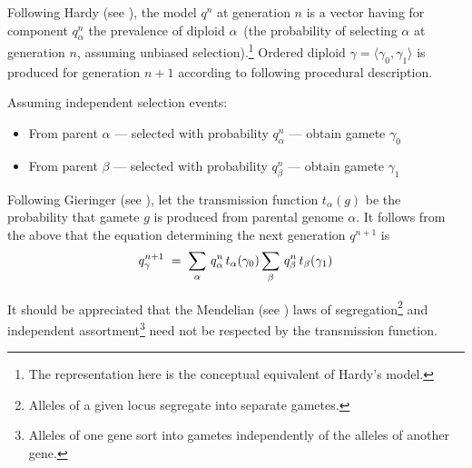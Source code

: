 Following Hardy (see \cite{Hardy1908}), the model $q^{n}$ at generation $n$
is a vector having for component $q_\alpha^n$ the prevalence of
diploid $\alpha\,$ (the probability of selecting $\alpha$ \nudge at
generation $n$, assuming unbiased selection).\footnote{The
  representation here is the conceptual equivalent of Hardy's model.}
Ordered diploid $\gamma = \langle \gamma_0, \gamma_1 \rangle$ is
produced for generation $n+1$ according to following procedural
description.

  Assuming independent selection events:
\begin{itemize}
\item From parent $\alpha$ --- selected with probability
  $q_\alpha^n$ --- obtain gamete $\gamma_0$
\item From parent $\beta$ --- selected with probability $q_\beta^n$
  --- obtain gamete $\gamma_1$
\end{itemize}
Following Gieringer (see \cite{Geiringer1944}), let the transmission
function $t_\alpha(g)$ be the probability that gamete $g$ is produced
from parental genome $\alpha$.  It follows from the above that the
equation determining the next generation $q^{n+1}$ is
\begin{equation}
\label{model0}
q_\gamma^{n+1} \; = \;
\sum_{\alpha} \, q_\alpha^n \, t_\alpha(\gamma_0) 
\sum_{\beta} \,q_\beta^n \, t_\beta(\gamma_1)\\[-.05in]
\end{equation}

It should be appreciated that the Mendelian (see \cite{Mendel1866}) laws of
segregation\footnote{Alleles of a given locus segregate into separate
  gametes.} and independent assortment\footnote{Alleles of one gene
  sort into gametes independently of the alleles of another gene.}
need not be respected by the transmission function.


